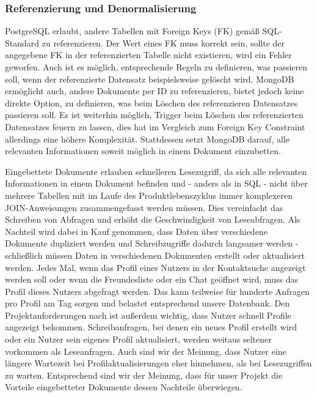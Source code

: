 \subsubsection{Referenzierung und Denormalisierung}
PostgreSQL erlaubt, andere Tabellen mit Foreign Keys (FK) gemäß SQL-Standard zu referenzieren. Der Wert eines FK muss korrekt sein, sollte der angegebene FK in der referenzierten Tabelle nicht existieren, wird ein Fehler geworfen. Auch ist es möglich, entsprechende Regeln zu definieren, was passieren soll, wenn der referenzierte Datensatz beispielsweise gelöscht wird.
MongoDB ermöglicht auch, andere Dokumente per ID zu referenzieren, bietet jedoch keine direkte Option, zu definieren, was beim Löschen des referenzieren Datensatzes passieren soll. Es ist weiterhin möglich, Trigger beim Löschen des referenzierten Datensatzes feuern zu lassen, dies hat im Vergleich zum Foreign Key Constraint allerdings eine höhere Komplexität. Stattdessen setzt MongoDB darauf, alle relevanten Informationen soweit möglich in einem Dokument einzubetten.

Eingebettete Dokumente erlauben schnelleren Lesezugriff, da sich alle relevanten Informationen in einem Dokument befinden und - anders als in SQL - nicht über mehrere Tabellen mit im Laufe des Produktlebenszyklus immer komplexeren JOIN-Anweisungen zusammengefasst werden müssen. Dies vereinfacht das Schreiben von Abfragen und erhöht die Geschwindigkeit von Leseabfragen. Als Nachteil wird dabei in Kauf genommen, dass Daten über verschiedene Dokumente dupliziert werden und Schreibzugriffe dadurch langsamer werden - schließlich müssen Daten in verschiedenen Dokumenten erstellt oder aktualisiert werden. 
Jedes Mal, wenn das Profil eines Nutzers in der Kontaktsuche angezeigt werden soll oder wenn die Freundesliste oder ein Chat geöffnet wird, muss das Profil dieses Nutzers abgefragt werden. Das kann teilweise für hunderte Anfragen pro Profil am Tag sorgen und belastet entsprechend unsere Datenbank. Den Projektanforderungen nach ist außerdem wichtig, dass Nutzer schnell Profile angezeigt bekommen. Schreibanfragen, bei denen ein neues Profil erstellt wird oder ein Nutzer sein eigenes Profil aktualisiert, werden weitaus seltener vorkommen als Leseanfragen. Auch sind wir der Meinung, dass Nutzer eine längere Wartezeit bei Profilaktualisierungen eher hinnehmen, als bei Lesezugriffen zu warten.
Entsprechend sind wir der Meinung, dass für unser Projekt die Vorteile eingebetteter Dokumente dessen Nachteile überwiegen.

